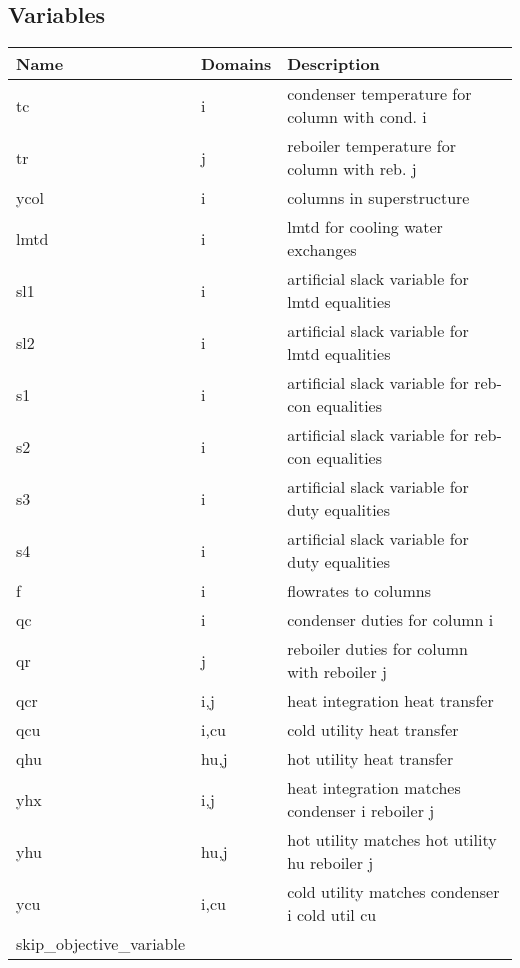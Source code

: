 \documentclass[11pt]{article}
\begin{document}
\subsection*{Variables}
\begin{tabularx}{\textwidth}{| l | l | X |}
\hline
\textbf{Name} & \textbf{Domains} & \textbf{Description}\\
\hline
\endhead

tc & i & condenser temperature for column with cond. i\\
tr & j & reboiler temperature for column with reb. j\\
ycol & i & columns in superstructure\\
lmtd & i & lmtd for cooling water exchanges\\
sl1 & i & artificial slack variable for lmtd equalities\\
sl2 & i & artificial slack variable for lmtd equalities\\
s1 & i & artificial slack variable for reb-con equalities\\
s2 & i & artificial slack variable for reb-con equalities\\
s3 & i & artificial slack variable for duty equalities\\
s4 & i & artificial slack variable for duty equalities\\
f & i & flowrates to columns\\
qc & i & condenser duties for column i\\
qr & j & reboiler duties for column with reboiler j\\
qcr & i,j & heat integration heat transfer\\
qcu & i,cu & cold utility heat transfer\\
qhu & hu,j & hot utility heat transfer\\
yhx & i,j & heat integration matches condenser i reboiler j\\
yhu & hu,j & hot utility matches hot utility hu reboiler j\\
ycu & i,cu & cold utility matches condenser i cold util cu\\
skip\_objective\_variable &  & \\
\hline
\end{tabularx}
\end{document}
